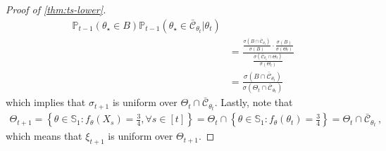 \documentclass[letter, 12pt]{report}
\newcommand{\cC}{\mathcal C}
\newcommand{\bS}{\mathbb S}
\newcommand{\1}{\mathbf{1}}
\newcommand{\mP}{\mathbb{P}}
\theoremstyle{plain}
\theoremstyle{definition}
\theoremstyle{remark}
\begin{document}
\begin{proof}[Proof of \cref{thm:ts-lower}]
\begin{align*}
{            \mP_{t-1}(\theta_\star \in B)
        }{
            \mP_{t-1}(\theta_\star \in \bar{\cC}_{\theta_t}| \theta_t)
        }
        \\
         & =
        \frac{
            \frac{
                \sigma(B \cap \bar{\cC}_{\theta_t})
            }{
                \sigma(B)
            }
            \cdot
            \frac{
                \sigma(B)
            }{
                \sigma(\Theta_t)
            }
        }{
            \frac{
                \sigma(\bar{\cC}_{\theta_t} \cap \Theta_t)
            }{
                \sigma(\Theta_t)
            }
        }
        \\
         & =
        \frac{
            \sigma(B \cap \bar{\cC}_{\theta_t})
        }{
            \sigma(\Theta_t \cap \bar{\cC}_{\theta_t})
        }
    \end{align*}
    which implies that $\sigma_{t+1}$ is uniform over
    $\Theta_{t} \cap \bar{\cC}_{\theta_t}$.
    Lastly, note that
    \begin{align*}
        \Theta_{t+1}
        =
        \left\{
        \theta \in \bS_1:
        f_\theta(X_s) = \frac34
        ,
        \forall s \in [t]
        \right\}
        =
        \Theta_t
        \cap
        \left\{
        \theta \in \bS_1:
        f_\theta(\theta_t) = \frac34
        \right\}
        =
        \Theta_t \cap \bar{\cC}_{\theta_t}\,,
    \end{align*}
    which means that $\xi_{t+1}$ is uniform over $\Theta_{t+1}$.


\end{proof}
\end{document}
